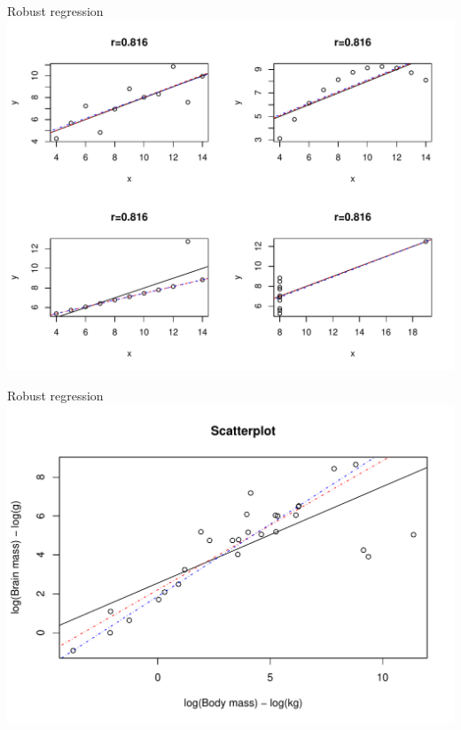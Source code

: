 \documentclass[t,xcolor=pdftex,dvipsnames,table]{beamer}
\makeatletter
\def\maxwidth{ %
  \ifdim\Gin@nat@width>\linewidth
    \linewidth
  \else
    \Gin@nat@width
  \fi
}
\newenvironment{knitrout}{}{} %
\makeatother
\begin{document}
\begin{frame}[fragile]{Robust regression}
\begin{knitrout}
\color{fgcolor}
\includegraphics[width=\maxwidth]{figure/unnamed-chunk-18-1} 

\end{knitrout}
\end{frame}

\begin{frame}[fragile]{Robust regression}
\begin{knitrout}
\color{fgcolor}
\includegraphics[width=\maxwidth]{figure/unnamed-chunk-19-1} 

\end{knitrout}
\end{frame}
\end{document}
